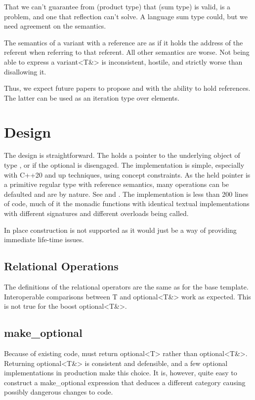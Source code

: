 \documentclass[a4paper,10pt,oneside,openany,final,article]{memoir}
\begin{document}
That we can't guarantee from  (product type) that  (sum type) is valid, is a problem, and one that reflection can't solve. A language sum type could, but we need agreement on the semantics.

The semantics of a variant with a reference are as if it holds the address of the referent when referring to that referent. All other semantics are worse. Not being able to express a variant<T\&> is inconsistent, hostile, and strictly worse than disallowing it.

Thus, we expect future papers to propose  and  with the ability to hold references.
The latter can be used as an iteration type over  elements.


\chapter{Design}

The design is straightforward. The  holds a pointer to the underlying object of type , or  if the optional is disengaged. The implementation is simple, especially with C++20 and up techniques, using concept constraints. As the held pointer is a primitive regular type with reference semantics, many operations can be defaulted and are  by nature. See \cite{Downey_smd_optional_optional_T} and \cite{rawgithu58:online}. The  implementation is less than 200 lines of code, much of it the monadic functions with identical textual implementations with different signatures and different overloads being called.

In place construction is not supported as it would just be a way of providing immediate life-time issues.

\section{Relational Operations}

The definitions of the relational operators are the same as for the base template. Interoperable comparisons between T and optional<T\&> work as expected. This is not true for the boost optional<T\&>.

\section{make_optional}
Because of existing code,  must return optional<T> rather than optional<T\&>. Returning optional<T\&> is consistent and defensible, and a few optional implementations in production make this choice. It is, however, quite easy to construct a make_optional expression that deduces a different category causing possibly dangerous changes to code.
\end{document}
